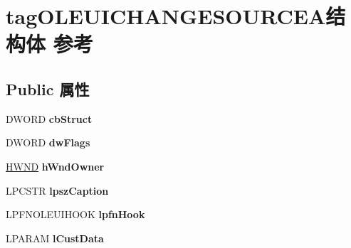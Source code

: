 \hypertarget{structtag_o_l_e_u_i_c_h_a_n_g_e_s_o_u_r_c_e_a}{}\section{tag\+O\+L\+E\+U\+I\+C\+H\+A\+N\+G\+E\+S\+O\+U\+R\+C\+E\+A结构体 参考}
\label{structtag_o_l_e_u_i_c_h_a_n_g_e_s_o_u_r_c_e_a}
\subsection*{Public 属性}
\begin{DoxyCompactItemize}
\item 
\mbox{\label{structtag_o_l_e_u_i_c_h_a_n_g_e_s_o_u_r_c_e_a_a3f57c51329334468dee47429c7eb96a2}} 
D\+W\+O\+RD {\bfseries cb\+Struct}
\item 
\mbox{\label{structtag_o_l_e_u_i_c_h_a_n_g_e_s_o_u_r_c_e_a_a68b46b196939df7c9a0a200379ff607e}} 
D\+W\+O\+RD {\bfseries dw\+Flags}
\item 
\mbox{\label{structtag_o_l_e_u_i_c_h_a_n_g_e_s_o_u_r_c_e_a_a00c2b24ac3b794c076da07c0aa6f9ed5}} 
\hyperlink{interfacevoid}{H\+W\+ND} {\bfseries h\+Wnd\+Owner}
\item 
\mbox{\label{structtag_o_l_e_u_i_c_h_a_n_g_e_s_o_u_r_c_e_a_a24187209c4a2a83cc49d330c3dd72728}} 
L\+P\+C\+S\+TR {\bfseries lpsz\+Caption}
\item 
\mbox{\label{structtag_o_l_e_u_i_c_h_a_n_g_e_s_o_u_r_c_e_a_a54a1407d47c8b615f5c4ef0244a95aa4}} 
L\+P\+F\+N\+O\+L\+E\+U\+I\+H\+O\+OK {\bfseries lpfn\+Hook}
\item 
\mbox{\label{structtag_o_l_e_u_i_c_h_a_n_g_e_s_o_u_r_c_e_a_abeec95b0fffc83edae9537d07f9707b5}} 
L\+P\+A\+R\+AM {\bfseries l\+Cust\+Data}
\item 
\mbox{\label{structtag_o_l_e_u_i_c_h_a_n_g_e_s_o_u_r_c_e_a_ab07ae912cd85bbe64dcf1214b9fe6f6a}} 

\end{DoxyCompactItemize}
